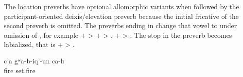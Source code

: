 The location preverbs have optional allomorphic variants when followed by the participant-oriented deixis/elevation preverb  because the initial fricative of the second preverb is omitted. The preverbs ending in  change that vowel to  under omission of , for example  +  >  +  > ,  +  > . The stop in the preverb  becomes labialized, that is  +  >  .
%
\begin{exe}
	\ex	\label{ex:(Somebody) set up verbs}
	\gll	c'a	gʷa-b-iq'-un	ca-b\\
		fire	set.fire	\\
	\glt	{}
\end{exe}


